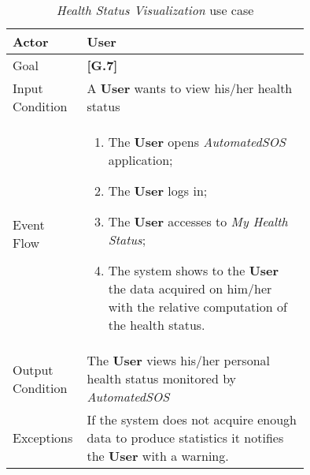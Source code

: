 \begin{center}
\begin{table}
\begin{tabular}{ | l | p{0.75\linewidth} | }
  \hline
    Actor & \textbf{User} \\ \hline
    Goal & \textbf{[G.7]} \\ \hline
    Input Condition & A \textbf{User} wants to view his/her health status\\ \hline
    Event Flow & \begin{minipage}[t]{0.7\textwidth}
      \begin{enumerate}
        \item The \textbf{User} opens \textit{AutomatedSOS} application;
        \item The \textbf{User} logs in;
        \item The \textbf{User} accesses to \textit{My Health Status};
        \item The system shows to the \textbf{User} the data acquired on him/her with the relative computation of the health status.
      \end{enumerate}
    \smallskip
  \end{minipage} \\ \hline
  Output Condition & The \textbf{User} views his/her personal health status monitored by \textit{AutomatedSOS}\\ \hline
  Exceptions & If the system does not acquire enough data to produce statistics it notifies the \textbf{User} with a warning.  \\ \hline
\end{tabular}
\caption{\textit{Health Status Visualization} use case}
\label{table:healthStatus}
\end{table}
\end{center}
